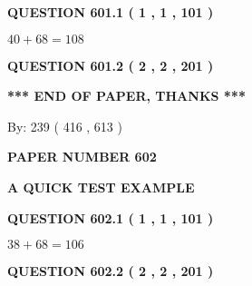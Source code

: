 \documentclass[12pt]{article}
\begin{document}
{\textbf{\Large{QUESTION
601.1 
 ( 1 , 1 , 101 )
}}}
  
  
 
 

$ %
40 +  %
68=   %
108$
 
 
  
\vspace{0.2in}
  
{\textbf{\Large{QUESTION
601.2 
 ( 2 , 2 , 201 )
}}}
  
  
   
   
 \vspace{0.2in}
 
   
   
   
   
\vspace{1.0in} 
{\textbf{\large{ *** END OF PAPER, THANKS *** }}} 
   
   
\hspace{1.0in} By: 
 239 ( 416 ,  613 )
   
   
   
   
\newpage 
\setcounter{page}{ 
   602001 } 
   
   
   
   
 {\textbf{ \Large{ PAPER NUMBER  602  }}}
   
   
\vspace{0.2in}
   
   
   
   
   
   
 \vspace{0.2in}
{\LARGE {\textbf{ A QUICK TEST EXAMPLE}}}
   
   
  
\vspace{0.2in}
  
{\textbf{\Large{QUESTION
602.1 
 ( 1 , 1 , 101 )
}}}
  
  
 
 

$ %
38 +  %
68=   %
106$
 
 
  
\vspace{0.2in}
  
{\textbf{\Large{QUESTION
602.2 
 ( 2 , 2 , 201 )
}}}
  
  
   
   
 \vspace{0.2in}
 
   
   
\end{document}

